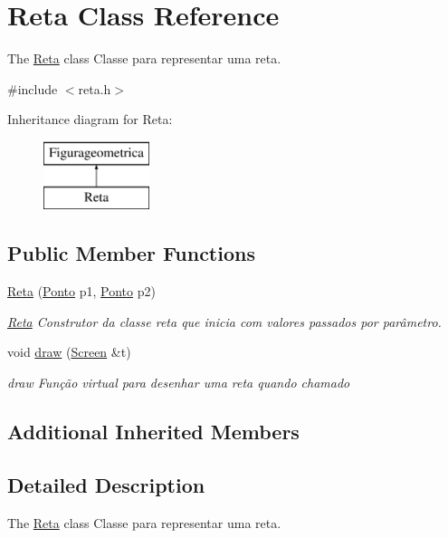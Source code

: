 \hypertarget{class_reta}{}\section{Reta Class Reference}
\label{class_reta}


The \mbox{\hyperlink{class_reta}{Reta}} class Classe para representar uma reta.  




{\ttfamily \#include $<$reta.\+h$>$}

Inheritance diagram for Reta\+:\begin{figure}[H]
\begin{center}
\leavevmode
\includegraphics[height=2.000000cm]{class_reta}
\end{center}
\end{figure}
\subsection*{Public Member Functions}
\begin{DoxyCompactItemize}
\item 
\mbox{\hyperlink{class_reta_a79c6845d930a7762d80224e5857fe3da}{Reta}} (\mbox{\hyperlink{class_ponto}{Ponto}} p1, \mbox{\hyperlink{class_ponto}{Ponto}} p2)
\begin{DoxyCompactList}\small\item\em \mbox{\hyperlink{class_reta}{Reta}} Construtor da classe reta que inicia com valores passados por parâmetro. \end{DoxyCompactList}\item 
void \mbox{\hyperlink{class_reta_ac2e9805183cd474b62bffd8b032cd780}{draw}} (\mbox{\hyperlink{class_screen}{Screen}} \&t)
\begin{DoxyCompactList}\small\item\em draw Função virtual para desenhar uma reta quando chamado \end{DoxyCompactList}\end{DoxyCompactItemize}
\subsection*{Additional Inherited Members}


\subsection{Detailed Description}
The \mbox{\hyperlink{class_reta}{Reta}} class Classe para representar uma reta. 

